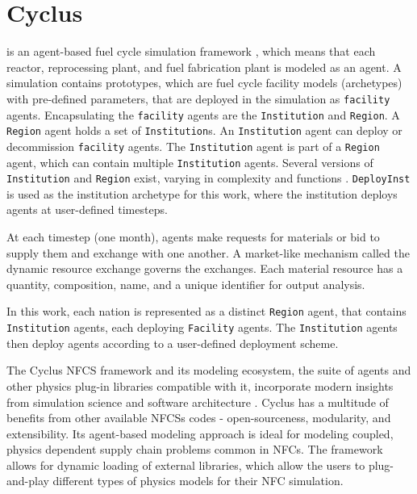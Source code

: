 \section{Cyclus}

\Cyclus is an agent-based fuel cycle simulation framework 
\cite{huff_fundamental_2016}, which means 
that each reactor, reprocessing plant, and fuel fabrication plant is modeled as an agent.
A \Cyclus simulation contains prototypes, which are fuel cycle facility models (archetypes) with
pre-defined parameters, that are deployed in the simulation as \texttt{facility} agents.
Encapsulating the \texttt{facility} agents are the \texttt{Institution} and \texttt{Region}.
A \texttt{Region} agent holds a set of \texttt{Institution}s. 
An \texttt{Institution} agent can deploy or decommission \texttt{facility} agents.
The \texttt{Institution} agent is part of a \texttt{Region} agent,
which can contain multiple \texttt{Institution} agents. Several versions of \texttt{Institution}
and \texttt{Region} exist, varying in complexity and functions \cite{huff_extensions_2014}.
\texttt{DeployInst} is used as the institution archetype for this work, where the institution
deploys agents at user-defined timesteps. 

At each timestep (one month),
agents make requests for materials or bid to supply them and exchange
with one another. A market-like mechanism called the dynamic resource exchange
\cite{gidden_agent-based_2015} governs the exchanges.
Each material resource has a quantity, composition, name, and a unique identifier
for output analysis. 

In this work, each nation is represented as a distinct \texttt{Region} agent,
that contains \texttt{Institution} agents, each deploying  \texttt{Facility} 
agents. The \texttt{Institution} agents then deploy agents according to 
a user-defined deployment scheme.

The Cyclus \gls{NFCS} framework and its
modeling ecosystem, the suite of agents and other
physics plug-in libraries compatible with it, incorporate
modern insights from simulation science and software
architecture \cite{huff_fundamental_2016}. Cyclus
has a multitude of benefits from other available
\glspl{NFCS} codes - open-sourceness, modularity,
and extensibility. Its agent-based modeling approach
is ideal for modeling coupled, physics dependent
supply chain problems common in \glspl{NFC}.
The framework allows for dynamic loading of 
external libraries, which allow the users to plug-and-play
different types of physics models for their \gls{NFC}
simulation.

